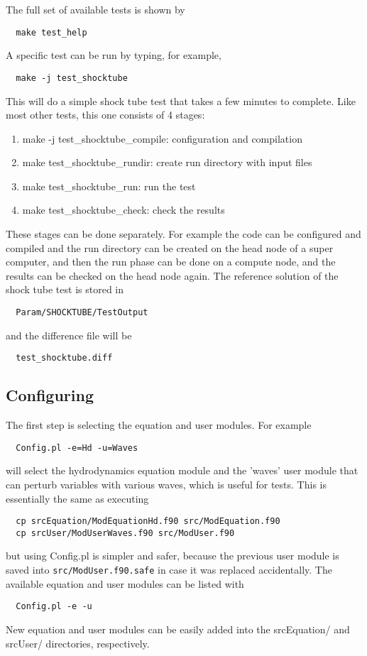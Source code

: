 The full set of available tests is shown by 
\begin{verbatim}
  make test_help
\end{verbatim}
A specific test can be run by typing, for example,
\begin{verbatim}
  make -j test_shocktube
\end{verbatim}
This will do a simple shock tube test that takes a few minutes to complete. 
Like most other tests, this one consists of 4 stages:
\begin{enumerate}
\item make -j test\_shocktube\_compile: configuration and compilation
\item make test\_shocktube\_rundir:  create run directory with input files
\item make test\_shocktube\_run:     run the test
\item make test\_shocktube\_check:   check the results
\end{enumerate}
These stages can be done separately. For example the code can be configured 
and compiled and the run directory can be created on the head node of 
a super computer, and then the run phase can be done on a compute node, 
and the results can be checked on the head node again.
The reference solution of the shock tube test is stored in 
\begin{verbatim}
  Param/SHOCKTUBE/TestOutput
\end{verbatim}
and the difference file will be
\begin{verbatim}
  test_shocktube.diff
\end{verbatim}


\subsection{Configuring \BATSRUS}

The first step is selecting the equation and user modules. For example 
\begin{verbatim}
  Config.pl -e=Hd -u=Waves
\end{verbatim}
will select the hydrodynamics equation module and the 'waves' user module
that can perturb variables with various waves, which is useful for tests.
This is essentially the same as executing
\begin{verbatim}
  cp srcEquation/ModEquationHd.f90 src/ModEquation.f90
  cp srcUser/ModUserWaves.f90 src/ModUser.f90
\end{verbatim}
but using Config.pl is simpler and safer, because the previous user module
is saved into {\tt src/ModUser.f90.safe} in case it was replaced accidentally.
The available equation and user modules can be listed with
\begin{verbatim}
  Config.pl -e -u
\end{verbatim}
New equation and user modules can be easily added into the srcEquation/
and srcUser/ directories, respectively.

